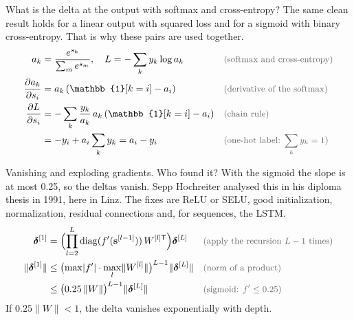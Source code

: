 \begin{qabox}{What is the delta at the output with softmax and cross-entropy?}
\explain The same clean result holds for a linear output with squared loss and for a sigmoid with
binary cross-entropy. That is why these pairs are used together.
\derive
\begin{align*}
a_k &= \frac{e^{s_k}}{\sum_m e^{s_m}},\quad L = -\sum_k y_k\log a_k \why{softmax and cross-entropy} \\
\frac{\partial a_k}{\partial s_i} &= a_k\,(\mathbb{1}[k=i] - a_i) \why{derivative of the softmax} \\
\frac{\partial L}{\partial s_i} &= -\sum_k \frac{y_k}{a_k}\,a_k\,(\mathbb{1}[k=i] - a_i) \why{chain rule} \\
&= -y_i + a_i\sum_k y_k = a_i - y_i \why{one-hot label: $\sum_k y_k = 1$}
\end{align*}
\end{qabox}

\begin{qabox}{Vanishing and exploding gradients. Who found it?}
\explain With the sigmoid the slope is at most 0.25, so the deltas vanish. Sepp Hochreiter analysed
this in his diploma thesis in 1991, here in Linz. The fixes are ReLU or SELU, good initialization,
normalization, residual connections and, for sequences, the LSTM.
\derive
\begin{align*}
\bm{\delta}^{[1]} &= \Bigl(\prod_{l=2}^{L} \mathrm{diag}(f'(\mathbf{s}^{[l-1]}))\,W^{[l]\mathsf{T}}\Bigr)\bm{\delta}^{[L]} \why{apply the recursion $L-1$ times} \\
\lVert\bm{\delta}^{[1]}\rVert &\le \bigl(\max\lvert f'\rvert\cdot\max_l\lVert W^{[l]}\rVert\bigr)^{L-1}\lVert\bm{\delta}^{[L]}\rVert \why{norm of a product} \\
&\le \bigl(0.25\,\lVert W\rVert\bigr)^{L-1}\lVert\bm{\delta}^{[L]}\rVert \why{sigmoid: $f' \le 0.25$}
\end{align*}
If $0.25\lVert W\rVert < 1$, the delta vanishes exponentially with depth.
\end{qabox}

